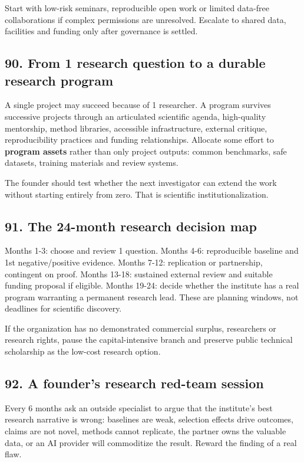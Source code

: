 Start with low-risk seminars, reproducible open work or limited data-free collaborations if complex permissions are unresolved. Escalate to shared data, facilities and funding only after governance is settled.

\subsection{90. From 1 research question to a durable research program}

A single project may succeed because of 1 researcher. A program survives successive projects through an articulated scientific agenda, high-quality mentorship, method libraries, accessible infrastructure, external critique, reproducibility practices and funding relationships. Allocate some effort to \textbf{program assets} rather than only project outputs: common benchmarks, safe datasets, training materials and review systems.

The founder should test whether the next investigator can extend the work without starting entirely from zero. That is scientific institutionalization.

\subsection{91. The 24-month research decision map}

Months 1-3: choose and review 1 question. Months 4-6: reproducible baseline and 1st negative/positive evidence. Months 7-12: replication or partnership, contingent on proof. Months 13-18: sustained external review and suitable funding proposal if eligible. Months 19-24: decide whether the institute has a real program warranting a permanent research lead. These are planning windows, not deadlines for scientific discovery.

If the organization has no demonstrated commercial surplus, researchers or research rights, pause the capital-intensive branch and preserve public technical scholarship as the low-cost research option.

\subsection{92. A founder's research red-team session}

Every 6 months ask an outside specialist to argue that the institute's best research narrative is wrong: baselines are weak, selection effects drive outcomes, claims are not novel, methods cannot replicate, the partner owns the valuable data, or an AI provider will commoditize the result. Reward the finding of a real flaw.

